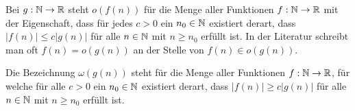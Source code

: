 \begin{defn} 
Bei $g : \mathbb{N} \to \mathbb{R}$ steht $o(f(n))$ für die Menge aller Funktionen $f: \mathbb{N} \to \mathbb{R}$ mit der Eigenschaft, dass für jedes $c>0$ ein $n_0 \in \mathbb{N}$ existiert derart, dass $|f(n)| \le c |g(n)|$ für alle $n \in \mathbb{N}$ mit $n \ge n_0$ erfüllt ist. In der Literatur schreibt man oft $f(n) = o(g(n))$ an der Stelle von $f(n) \in o(g(n))$. 
\end{defn} 

\begin{defn}
Die Bezeichnung $\omega(g(n))$ steht für die Menge aller Funktionen $f : \mathbb{N} \to \mathbb{R}$, für welche für alle $c>0$ ein $n_0 \in \mathbb{N}$ existiert derart, dass $|f(n)| \ge c|g(n)|$ für alle $n \in \mathbb{N}$ mit $n \ge n_0$ erfüllt ist. 
\end{defn} 
